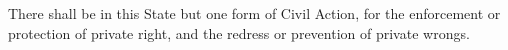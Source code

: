 There shall be in this State but one form of Civil Action, for the enforcement or protection of private right, and the redress or prevention of private wrongs.